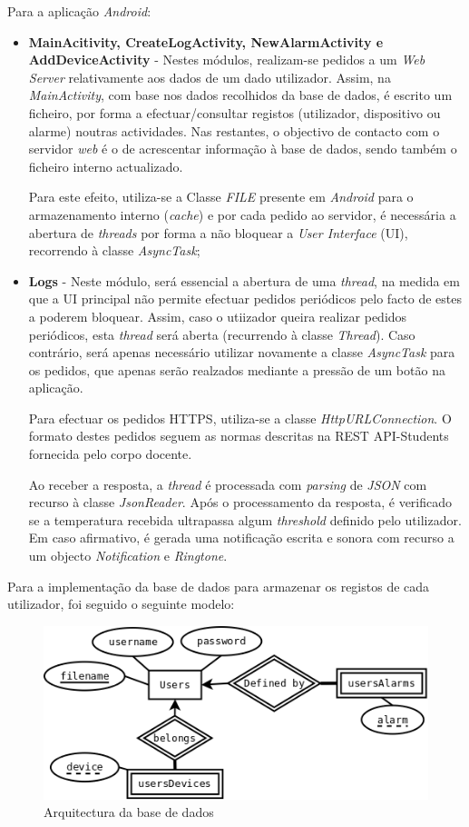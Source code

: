 \documentclass[a4paper]{article}
\begin{document}
Para a aplicação \textit{Android}:
\begin{itemize}
\item \textbf{MainAcitivity, CreateLogActivity, NewAlarmActivity e AddDeviceActivity} - Nestes módulos, realizam-se pedidos a um \textit{Web Server} relativamente aos dados de um dado utilizador. Assim, na \textit{MainActivity}, com base nos dados recolhidos da base de dados, é escrito um ficheiro, por forma a efectuar/consultar registos (utilizador, dispositivo ou alarme) noutras actividades. Nas restantes, o objectivo de contacto com o servidor \textit{web} é o de acrescentar informação à base de dados, sendo também o ficheiro interno actualizado. 

Para este efeito, utiliza-se a Classe \textit{FILE} presente em \textit{Android} para o armazenamento interno (\textit{cache}) e por cada pedido ao servidor, é necessária a abertura de \textit{threads} por forma a não bloquear a \textit{User Interface} (UI), recorrendo à classe \textit{AsyncTask};

\item \textbf{Logs} - Neste módulo, será essencial a abertura de uma \textit{thread}, na medida em que a UI principal não permite efectuar pedidos periódicos pelo facto de estes a poderem bloquear. Assim, caso o utiizador queira realizar pedidos periódicos, esta \textit{thread} será aberta (recurrendo à classe \textit{Thread}). Caso contrário, será apenas necessário utilizar novamente a classe \textit{AsyncTask} para os pedidos, que apenas serão realzados mediante a pressão de um botão na aplicação.

Para efectuar os pedidos HTTPS, utiliza-se a classe \textit{HttpURLConnection}. O formato destes pedidos seguem as normas descritas na REST API-Students fornecida pelo corpo docente.

Ao receber a resposta, a \textit{thread} é processada com \textit{parsing} de \textit{JSON} com recurso à classe \textit{JsonReader}. Após o processamento da resposta, é verificado se a temperatura recebida ultrapassa algum \textit{threshold} definido pelo utilizador. Em caso afirmativo, é gerada uma notificação escrita e sonora com recurso a um objecto \textit{Notification} e \textit{Ringtone}.
\end{itemize}

Para a implementação da base de dados para armazenar os registos de cada utilizador, foi seguido o seguinte modelo:

\begin{figure}[H]
  \centering
  \includegraphics[scale=0.40]{DB-ER.png}
  \caption{Arquitectura da base de dados}
  \label{fig:db-er}
\end{figure}
\end{document}
